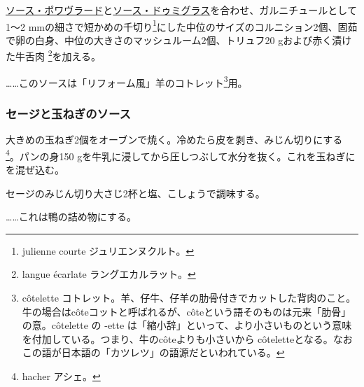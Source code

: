 \begin{recette}
\protect\hyperlink{sauce-poivrade}{ソース・ポワヴラード}と\protect\hyperlink{sauce-demi-glace}{ソース・ドゥミグラス}を合わせ、ガルニチュールとして1〜2
mmの細さで短かめの千切り\footnote{julienne courte ジュリエンヌクルト。}にした中位のサイズのコルニション2個、固茹で卵の白身、中位の大きさのマッシュルーム2個、トリュフ20
gおよび赤く漬けた牛舌肉 \footnote{langue écarlate ラングエカルラット。}を加える。

\ldots{}\ldots{}このソースは「リフォーム風」羊のコトレット\footnote{côtelette
  コトレット。羊、仔牛、仔羊の肋骨付きでカットした背肉のこと。牛の場合はcôteコットと呼ばれるが、côteという語そのものは元来「肋骨」の意。côtelette
  の -ette
  は「縮小辞」といって、より小さいものという意味を付加している。つまり、牛のcôteよりも小さいから
  côteletteとなる。なおこの語が日本語の「カツレツ」の語源だといわれている。}用。

\atoaki{}

\hypertarget{sage-and-onions-sauce}{%
\subsubsection{セージと玉ねぎのソース}\label{sage-and-onions-sauce}}



大きめの玉ねぎ2個をオーブンで焼く。冷めたら皮を剥き、みじん切りにする
\footnote{hacher アシェ。}。パンの身150
gを牛乳に浸してから圧しつぶして水分を抜く。これを玉ねぎにを混ぜ込む。

セージのみじん切り大さじ2杯と塩、こしょうで調味する。

\ldots{}\ldots{}これは鴨の詰め物にする。


\end{recette}
